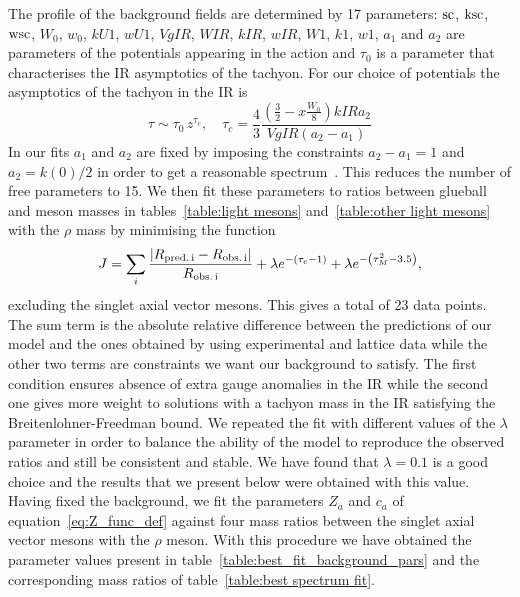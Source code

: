 \documentclass[a4paper,12pt]{article}
\begin{document}
The profile of the background fields are determined by 17 parameters: $\rm{sc}$, $\rm{ksc}$, $\rm{wsc}$, $W_0$, $w_0$, $kU1$, $wU1$, $VgIR$, $WIR$, $kIR$, $wIR$, $W1$, $k1$, $w1$, $a_1$ and $a_2$ are parameters of the potentials appearing in the action and $\tau_0$ is a parameter that characterises the IR asymptotics of the tachyon. For our choice of potentials the asymptotics of the tachyon in the IR is
\begin{equation}
\tau \sim \tau_0 \, z^{\tau_c}, \quad \tau_c = \frac{4}{3} \frac{\left(\frac{3}{2} - x \frac{W_0}{8}\right) kIR a_2}{VgIR (a_2 - a_1)}
\end{equation}
In our fits $a_1$ and $a_2$ are fixed by imposing the constraints $a_2 - a_1 = 1$ and $a_2 = k(0) / 2$ in order to get a reasonable spectrum~\cite{Jarvinen:2015ofa}. This reduces the number of free parameters to 15. We then fit these parameters to ratios between glueball and meson masses in tables~\ref{table:light mesons} and~\ref{table:other light mesons} with the $\rho$ mass by minimising the function
\begin{equation}
J = \sum_{i} \frac{|R_{\rm{pred.} \,i} - R_{\rm{obs.} \, i}|}{R_{\rm{obs.} \, i}} + \lambda e^{- \left(\tau_c - 1\right)} + \lambda e^{-\left( \tau_M^2 - 3.5 \right)},
\end{equation}
excluding the singlet axial vector mesons. This gives a total of 23 data points. The sum term is the absolute relative difference between the predictions of our model and the ones obtained by using experimental and lattice data while the other two terms are constraints we want our background to satisfy. The first condition ensures absence of extra gauge anomalies in the IR while the second one gives more weight to solutions with a tachyon mass in the IR satisfying the Breitenlohner-Freedman bound. We repeated the fit with different values of the $\lambda$ parameter in order to balance the ability of the model to reproduce the observed ratios and still be consistent and stable. We have found that $\lambda = 0.1$ is a good choice and the results that we present below were obtained with this value. Having fixed the background, we fit the parameters $Z_a$ and $c_a$ of equation~\ref{eq:Z_func_def} against four mass ratios between the singlet axial vector mesons with the $\rho$ meson. With this procedure we have obtained the parameter values present in table~\ref{table:best_fit_background_pars} and the corresponding mass ratios of table~\ref{table:best spectrum fit}.
\end{document}
